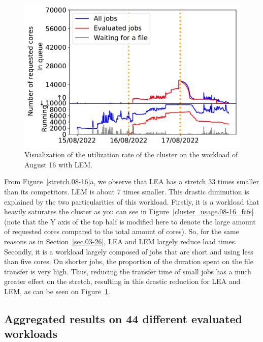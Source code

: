 \documentclass[conference,10pt]{IEEEtran}
\begin{document}
\begin{figure}[t]\centering\includegraphics[width=1\linewidth]{../MBSS/plot/Cluster_usage/2022-08-16->2022-08-16_V10000_Fcfs_with_a_score_mixed_strategy_x500_x1_x0_x0_Used_nodes_Reduced_450_128_32_256_4_1024_core_by_core.pdf}\caption{Visualization of the utilization rate of the cluster on the workload of August 16 with LEM.}
\label{cluster_usage.08-16_lem}\end{figure}

From Figure~\ref{stretch.08-16}a, we observe that LEA has a stretch 33 times smaller than
its competitors. LEM is about 7 times smaller. This drastic diminution is explained
by the two particularities of this workload.
Firstly, it is a workload that heavily saturates the cluster as you can see in Figure~\ref{cluster_usage.08-16_fcfs}
(note that the Y axis of the top half is modified here to denote the large amount of requested cores compared to the total amount of cores).
So, for the same reasons as in Section~\ref{sec.03-26}, LEA and LEM largely reduce load times.
Secondly, it is a workload largely composed of jobs that are short and using less than five cores.
On shorter jobs, the proportion of the duration spent on the file transfer is very high. 
Thus, reducing the transfer time of small jobs has a much greater effect on the stretch, resulting in this 
drastic reduction for LEA and LEM, as can be seen on Figure~\ref{cluster_usage.08-16_lem}.

\subsection{Aggregated results on 44 different evaluated workloads}
\end{document}
